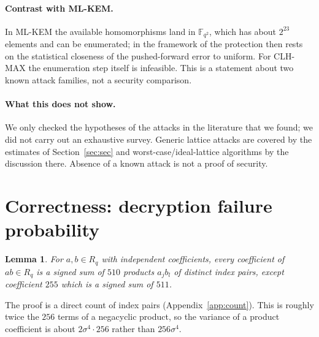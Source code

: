 \documentclass[11pt]{article}
\newtheorem{lemma}{Lemma}
\theoremstyle{remark}
\newcommand{\F}{\mathbb{F}}
\newcommand{\Rq}{R_q}
\begin{document}
\paragraph{Contrast with ML-KEM.} In ML-KEM the available homomorphisms land in $\F_{q^2}$, which has about $2^{23}$ elements and can be enumerated; in the framework of \cite{CLS17} the protection then rests on the statistical closeness of the pushed-forward error to uniform. For CLH-MAX the enumeration step itself is infeasible. This is a statement about two known attack families, not a security comparison.

\paragraph{What this does not show.} We only checked the hypotheses of the attacks in the literature that we found; we did not carry out an exhaustive survey. Generic lattice attacks are covered by the estimates of Section~\ref{sec:sec} and worst-case/ideal-lattice algorithms by the discussion there. Absence of a known attack is not a proof of security.

\section{Correctness: decryption failure probability}\label{sec:dfp}
\begin{lemma}\label{lem:count}
For $a,b\in\Rq$ with independent coefficients, every coefficient of $ab\in\Rq$ is a signed sum of $510$ products $a_jb_l$ of distinct index pairs, except coefficient $255$ which is a signed sum of $511$.
\end{lemma}
\noindent The proof is a direct count of index pairs (Appendix~\ref{app:count}). This is roughly twice the $256$ terms of a negacyclic product, so the variance of a product coefficient is about $2\sigma^4\cdot256$ rather than $256\sigma^4$.
\end{document}
